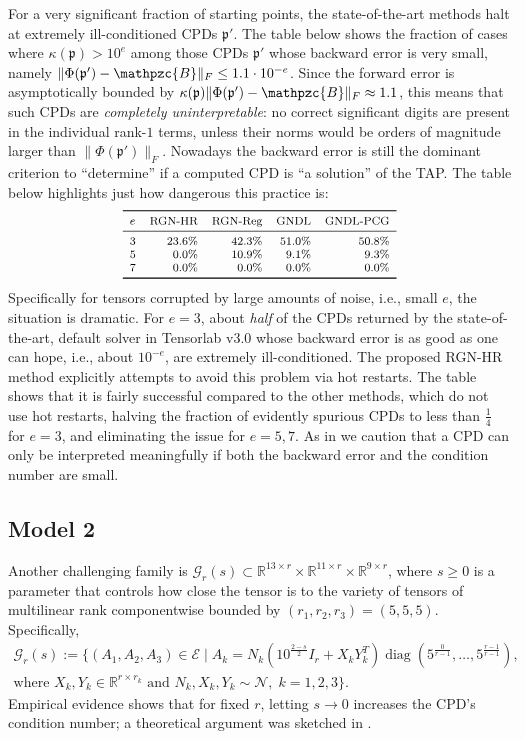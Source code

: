 \documentclass[a4paper,10pt,final]{siamart1116}
\newcommand{\tuple}[1]{\mathfrak{#1}}
\newcommand{\Var}[1]{\mathcal{#1}}
\newcommand{\tensor}[1]{\mathpzc{#1}}
\newcommand{\diag}{\operatorname{diag}}
\newcommand{\R}{\mathbb{R}}
\numberwithin{equation}{section}
\numberwithin{figure}{section}
\numberwithin{table}{section}
\numberwithin{theorem}{section}
\begin{document}
For a very significant fraction of starting points, the state-of-the-art methods halt at extremely ill-conditioned CPDs $\tuple{p}'$. The table below shows the fraction of cases where $\kappa(\tuple{p}) > 10^e$ among those CPDs $\tuple{p}'$ whose backward error is very small, namely $\|\Phi(\tuple{p}') - \tensor{B}\|_F \le 1.1 \cdot 10^{-e}$. Since the forward error is asymptotically bounded by $\kappa(\tuple{p}) \|\Phi(\tuple{p}') - \tensor{B}\|_F \approx 1.1$, this means that such CPDs are \emph{completely uninterpretable}: no correct significant digits are present in the individual rank-$1$ terms, unless their norms would be orders of magnitude larger than $\|\Phi(\tuple{p}')\|_F$. Nowadays the backward error is still the dominant criterion to ``determine'' if a computed CPD is ``a solution'' of the TAP. The table below highlights just how dangerous this practice is:
\[\footnotesize
 \begin{array}{lrrrr}
  \toprule
  e & \text{RGN-HR} & \text{RGN-Reg} & \text{GNDL} & \text{GNDL-PCG} \\
  \midrule
  3 & 23.6\%   &	42.3\% &	51.0\% &	50.8\% \\
  5 & 0.0\%    & 	10.9\% &	9.1\%  &	9.3\% \\
  7 & 0.0\%    &	0.0\%  &	0.0\%  &	0.0\% \\
  \bottomrule
 \end{array}
\]
Specifically for tensors corrupted by large amounts of noise, i.e., small $e$, the situation is dramatic. For $e=3$, about \emph{half} of the CPDs returned by the state-of-the-art, default solver in Tensorlab v3.0 whose backward error is as good as one can hope, i.e., about $10^{-e}$, are extremely ill-conditioned. The proposed RGN-HR method explicitly attempts to avoid this problem via hot restarts. The table shows that it is fairly successful compared to the other methods, which do not use hot restarts, halving the fraction of evidently spurious CPDs to less than $\frac{1}{4}$ for $e=3$, and eliminating the issue for $e = 5, 7$. As in \cite{V2017,BV2017} we caution that a CPD can only be interpreted meaningfully if both the backward error and the condition number are small.

\subsection{Model 2}\label{sec_model2}
Another challenging family is $\Var{G}_{r}(s)\subset \R^{13\times r}\times \R^{11\times r} \times \R^{9\times r}$, where $s \ge 0$ is a parameter that controls how close the tensor is to the variety of tensors of multilinear rank componentwise bounded by $(r_1,r_2,r_3) = (5,5,5)$. Specifically,
\begin{multline*} %
 \Var{G}_{r}(s) := \{ (A_1, A_2, A_3) \in \Var{E} \;|\; A_k = N_k (10^{\frac{2-s}{2}} I_r + X_k Y_k^T ) \diag( 5^{\frac{0}{r-1}}, \ldots, 5^{\frac{r-1}{r-1}}), \\
 \text{where } X_k, Y_k \in \R^{r \times r_k} \text{ and } N_k, X_k, Y_k \sim \Var{N},\; k=1,2,3 \}.
\end{multline*}
Empirical evidence shows that for fixed $r$, letting $s \to 0$ increases the CPD's condition number; a theoretical argument was sketched in \cite[section 6.1]{BV2017}.
\end{document}
